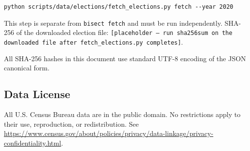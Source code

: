 \begin{verbatim}
python scripts/data/elections/fetch_elections.py fetch --year 2020
\end{verbatim}

\noindent This step is separate from \texttt{bisect fetch} and must be run independently.
SHA-256 of the downloaded election file: \texttt{[placeholder --- run \texttt{sha256sum}
on the downloaded file after \texttt{fetch\_elections.py} completes]}.

\noindent All SHA-256 hashes in this document use standard UTF-8 encoding of the
JSON canonical form.

\subsection*{Data License}

All U.S. Census Bureau data are in the public domain.
No restrictions apply to their use, reproduction, or redistribution.
See \url{https://www.census.gov/about/policies/privacy/data-linkage/privacy-confidentiality.html}.
